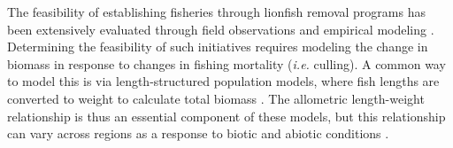 \documentclass[fleqn,10pt,lineno]{wlpeerj} %
\providecommand{\DIFadd}[1]{{\protect\color{blue}\uwave{#1}}} %
\providecommand{\DIFaddbegin}{} %
\providecommand{\DIFaddend}{} %
\begin{document}
The feasibility of establishing fisheries through lionfish removal
programs has been extensively evaluated through field observations and
empirical modeling
\citep{barbour_2011,morris_2011,deleon_2013,johnston_2015,sandel_2015,usseglio_2017}.
Determining the feasibility of such initiatives requires modeling the
change in biomass in response to changes in fishing mortality
(\emph{i.e.\DIFaddbegin \DIFadd{,}\DIFaddend } culling). A common way to model this is via
length-structured population models, where fish lengths are converted to
weight to calculate total biomass
\citep{barbour_2011,cote_2014,andradibrown_2017}. The allometric
length-weight relationship is thus an essential component of these
models, but this relationship can vary across regions as a response to
biotic and abiotic conditions \citep{johnson_2016}.
\end{document}
